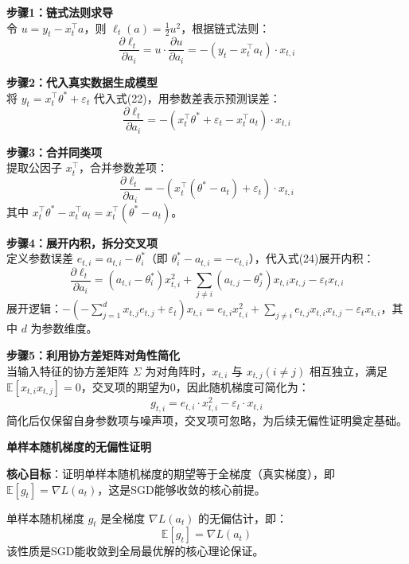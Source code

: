 \documentclass[10pt]{article}
\numberwithin{equation}{section}
\theoremstyle{plain}
\theoremstyle{definition}
\theoremstyle{remark}
\begin{document}
\textbf{步骤1：链式法则求导}\\
令 $u = y_t - x_t^\top a$，则 $\displaystyle \ell_t(a) = \frac{1}{2}u^2$，根据链式法则：
\[ \displaystyle \frac{\partial \ell_t}{\partial a_i} = u \cdot \frac{\partial u}{\partial a_i} = -(y_t - x_t^\top a_t) \cdot x_{t,i} \tag{22} \]

\textbf{步骤2：代入真实数据生成模型}\\
将 $y_t = x_t^\top \theta^* + \varepsilon_t$ 代入式(22)，用参数差表示预测误差：
\[ \displaystyle \frac{\partial \ell_t}{\partial a_i} = -(x_t^\top \theta^* + \varepsilon_t - x_t^\top a_t) \cdot x_{t,i} \tag{23} \]

\textbf{步骤3：合并同类项}\\
提取公因子 $x_t^\top$，合并参数差项：
\[ \displaystyle \frac{\partial \ell_t}{\partial a_i} = -\left(x_t^\top (\theta^* - a_t) + \varepsilon_t\right) \cdot x_{t,i} \tag{24} \]
其中 $x_t^\top \theta^* - x_t^\top a_t = x_t^\top (\theta^* - a_t)$。

\textbf{步骤4：展开内积，拆分交叉项}\\
定义参数误差 $e_{t,i} = a_{t,i} - \theta^*_i$（即 $\theta^*_i - a_{t,i} = -e_{t,i}$），代入式(24)展开内积：
\[ \displaystyle \frac{\partial \ell_t}{\partial a_i} = (a_{t,i} - \theta^*_i)x_{t,i}^2 + \sum_{j \neq i} (a_{t,j} - \theta^*_j)x_{t,i}x_{t,j} - \varepsilon_t x_{t,i} \tag{25} \]
展开逻辑：$\displaystyle -\left(-\sum_{j=1}^d x_{t,j}e_{t,j} + \varepsilon_t\right)x_{t,i} = e_{t,i}x_{t,i}^2 + \sum_{j \neq i} e_{t,j}x_{t,i}x_{t,j} - \varepsilon_t x_{t,i}$，其中 $d$ 为参数维度。

\textbf{步骤5：利用协方差矩阵对角性简化}\\
当输入特征的协方差矩阵 $\Sigma$ 为对角阵时，$x_{t,i}$ 与 $x_{t,j}(i \neq j)$ 相互独立，满足 $\mathbb{E}[x_{t,i}x_{t,j}] = 0$，交叉项的期望为0，因此随机梯度可简化为：
\[ \displaystyle g_{t,i} = e_{t,i} \cdot x_{t,i}^2 - \varepsilon_t \cdot x_{t,i} \tag{26} \]
简化后仅保留自身参数项与噪声项，交叉项可忽略，为后续无偏性证明奠定基础。

{\par\vspace{0.8ex}\noindent\normalsize\bfseries\color{secblue} 单样本随机梯度的无偏性证明\par}
\textbf{核心目标}：证明单样本随机梯度的期望等于全梯度（真实梯度），即 $\mathbb{E}[g_t] = \nabla L(a_t)$，这是SGD能够收敛的核心前提。

\begin{RemarkBox}[定理 4.4.1 (SGD无偏性)]
单样本随机梯度 $g_t$ 是全梯度 $\nabla L(a_t)$ 的无偏估计，即：
\[ \displaystyle \mathbb{E}[g_t] = \nabla L(a_t) \]
该性质是SGD能收敛到全局最优解的核心理论保证。
\end{RemarkBox}
\end{document}
